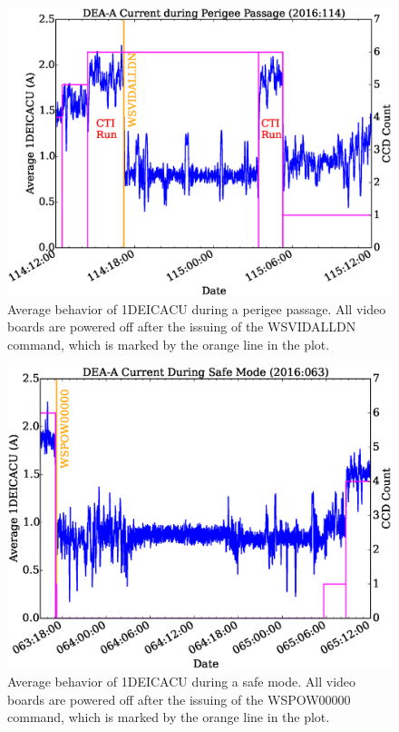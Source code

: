 \documentclass[11pt]{article}
\begin{document}
\begin{landscape}
\begin{figure}
\begin{center}
\includegraphics[width=1.2\textwidth]{switch_deaa_b_fig1.eps}
\caption{Average behavior of 1DEICACU during a perigee passage. All video boards
are powered off after the issuing of the WSVIDALLDN command, which is marked by
the orange line in the plot.}
\end{center}
\end{figure}
\end{landscape}
  
\begin{landscape}
\begin{figure}
\begin{center}
\includegraphics[width=1.2\textwidth]{switch_deaa_b_fig2.eps}
\caption{Average behavior of 1DEICACU during a safe mode. All video boards
are powered off after the issuing of the WSPOW00000 command, which is marked by
the orange line in the plot.}
\end{center}
\end{figure}
\end{landscape}
  
\newcommand{\tablecaptiontext}{SWITCH FROM DEA A TO DEA B}

\end{document}
